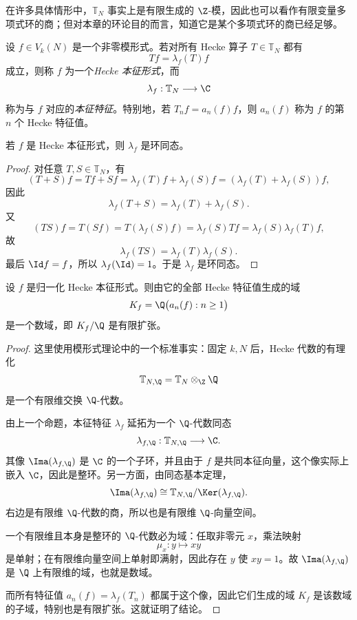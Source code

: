 \begin{remark}
在许多具体情形中，$\mathbb{T}_N$ 事实上是有限生成的 $\Z$-模，因此也可以看作有限变量多项式环的商；但对本章的环论目的而言，知道它是某个多项式环的商已经足够。
\end{remark}

\begin{definition}
设 $f\in V_k(N)$ 是一个非零模形式。若对所有 Hecke 算子 $T\in\mathbb{T}_N$ 都有
\[
Tf=\lambda_f(T)f
\]
成立，则称 $f$ 为一个\emph{Hecke 本征形式}，而
\[
\lambda_f:\mathbb{T}_N\longrightarrow \C
\]
称为与 $f$ 对应的\emph{本征特征}。特别地，若 $T_n f=a_n(f)f$，则 $a_n(f)$ 称为 $f$ 的第 $n$ 个 Hecke 特征值。
\end{definition}

\begin{proposition}
若 $f$ 是 Hecke 本征形式，则 $\lambda_f$ 是环同态。
\end{proposition}

\begin{proof}
对任意 $T,S\in\mathbb{T}_N$，有
\[
(T+S)f=Tf+Sf=\lambda_f(T)f+\lambda_f(S)f=(\lambda_f(T)+\lambda_f(S))f,
\]
因此
\[
\lambda_f(T+S)=\lambda_f(T)+\lambda_f(S).
\]
又
\[
(TS)f=T(Sf)=T(\lambda_f(S)f)=\lambda_f(S)Tf=\lambda_f(S)\lambda_f(T)f,
\]
故
\[
\lambda_f(TS)=\lambda_f(T)\lambda_f(S).
\]
最后 $\Id f=f$，所以 $\lambda_f(\Id)=1$。于是 $\lambda_f$ 是环同态。
\end{proof}

\begin{theorem}
设 $f$ 是归一化 Hecke 本征形式。则由它的全部 Hecke 特征值生成的域
\[
K_f=\Q\bigl(a_n(f):n\ge 1\bigr)
\]
是一个数域，即 $K_f/\Q$ 是有限扩张。
\end{theorem}

\begin{proof}
这里使用模形式理论中的一个标准事实：固定 $k,N$ 后，Hecke 代数的有理化
\[
\mathbb{T}_{N,\Q}=\mathbb{T}_N\otimes_\Z \Q
\]
是一个有限维交换 $\Q$-代数。

由上一个命题，本征特征 $\lambda_f$ 延拓为一个 $\Q$-代数同态
\[
\lambda_{f,\Q}:\mathbb{T}_{N,\Q}\longrightarrow \C.
\]
其像 $\Ima(\lambda_{f,\Q})$ 是 $\C$ 的一个子环，并且由于 $f$ 是共同本征向量，这个像实际上嵌入 $\C$，因此是整环。另一方面，由同态基本定理，
\[
\Ima(\lambda_{f,\Q})\cong \mathbb{T}_{N,\Q}/\Ker(\lambda_{f,\Q}).
\]
右边是有限维 $\Q$-代数的商，所以也是有限维 $\Q$-向量空间。

一个有限维且本身是整环的 $\Q$-代数必为域：任取非零元 $x$，乘法映射
\[
\mu_x:y\mapsto xy
\]
是单射；在有限维向量空间上单射即满射，因此存在 $y$ 使 $xy=1$。故 $\Ima(\lambda_{f,\Q})$ 是 $\Q$ 上有限维的域，也就是数域。

而所有特征值 $a_n(f)=\lambda_f(T_n)$ 都属于这个像，因此它们生成的域 $K_f$ 是该数域的子域，特别也是有限扩张。这就证明了结论。
\end{proof}


